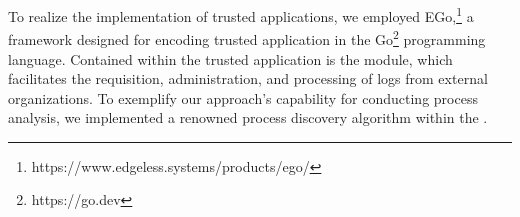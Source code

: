 To realize the implementation of trusted applications, we employed EGo,\footnote{https://www.edgeless.systems/products/ego/} a framework designed for encoding trusted application in the Go\footnote{https://go.dev} programming language. Contained within the trusted application is the  module, which facilitates the requisition, administration, and processing of logs from external organizations. To exemplify our approach's capability for conducting process analysis, we implemented a renowned process discovery algorithm within the . 

